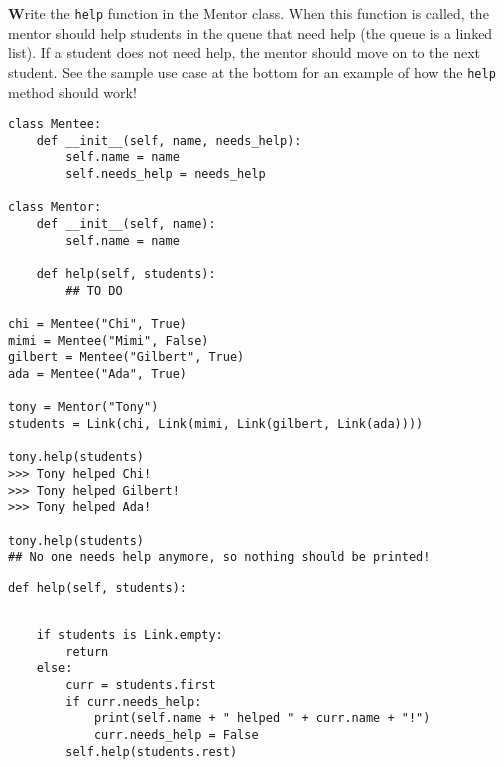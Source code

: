 \begin{blocksection}
\question \textbf Write the \texttt{help} function in the Mentor class. When this function is called, the mentor should help students in the queue that need help (the queue is a linked list). If a student does not need help, the mentor should move on to the next student. See the sample use case at the bottom for an example of how the \texttt{help} method should work!

\begin{lstlisting}
class Mentee:
    def __init__(self, name, needs_help):
        self.name = name
        self.needs_help = needs_help

class Mentor:
    def __init__(self, name):
        self.name = name

    def help(self, students):
        ## TO DO

chi = Mentee("Chi", True)
mimi = Mentee("Mimi", False)
gilbert = Mentee("Gilbert", True)
ada = Mentee("Ada", True)

tony = Mentor("Tony")
students = Link(chi, Link(mimi, Link(gilbert, Link(ada))))

tony.help(students)
>>> Tony helped Chi!
>>> Tony helped Gilbert!
>>> Tony helped Ada!

tony.help(students)
## No one needs help anymore, so nothing should be printed!
\end{lstlisting}
\end{blocksection}
\begin{lstlisting}
def help(self, students):
    
\end{lstlisting}
\begin{blocksection}
\begin{solution}
\begin{lstlisting}
    if students is Link.empty:
        return
    else:
        curr = students.first
        if curr.needs_help:
            print(self.name + " helped " + curr.name + "!")
            curr.needs_help = False
        self.help(students.rest)
\end{lstlisting}
\end{solution}
\end{blocksection}